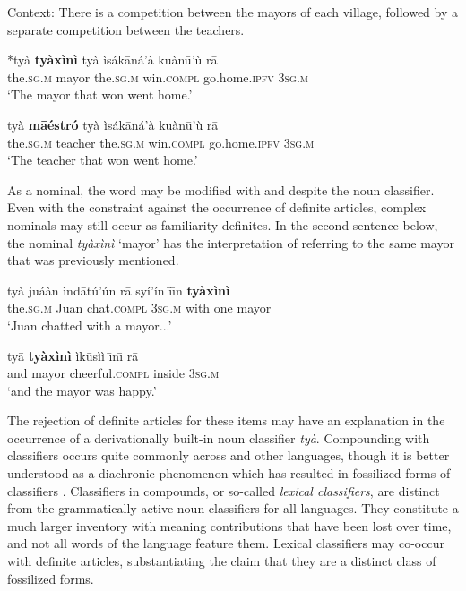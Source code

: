 \documentclass[output=paper,modfonts,nonflat]{langsci/langscibook}
\begin{document}
\ea {}\label{ex:cisneros:81}
Context: There is a competition between the mayors of each village, followed by a separate competition between the teachers.

\ea
\gll
{\ob}{\op}\textnormal{*}ty\`a{\cp} \textbf{ty\`ax\`in\`i} ty\`a \`is\'ak\=an\'a'\`a{\cb} ku\`an\=u'\`u r\=a\\
\phantom{[(*}the.\textsc{sg.m} mayor the.\textsc{sg.m} win.\textsc{compl} go.home.\textsc{ipfv} 3\textsc{sg.m}\\
\glt
`The mayor that won went home.'

\ex
\gll
{\ob}{\op}ty\`a{\cp} \textbf{m\=a\'estr\'o} ty\`a \`is\'ak\=an\'a'\`a{\cb} ku\`an\=u'\`u r\=a\\
\phantom{[(}the.\textsc{sg.m} teacher the.\textsc{sg.m} win.\textsc{compl} go.home.\textsc{ipfv} 3\textsc{sg.m}\\
\glt
`The teacher that won went home.'
\z  
\z
 
As a nominal, the word may be modified with  and  despite the noun classifier. Even with the constraint against the occurrence of definite articles, complex nominals may still occur as familiarity definites.  In the second sentence below, the nominal \textit{ty\`ax\`in\`i} `mayor' has the interpretation of referring to the same mayor that was previously mentioned.

\ea {}\label{ex:cisneros:82}
\gll
{\ob}ty\`a ju\'a\`an{\cb} \`ind\=at\'u'\'un r\=a sy\'i'\'in {\ob}\=\i\=\i n \textbf{ty\`ax\`in\`i}{\cb}\\
{\db}the.\textsc{sg.m} Juan chat.\textsc{compl} 3\textsc{sg.m} with {\db}one mayor\\
\glt
`Juan chatted with a mayor...'

\ea
\gll
ty\=a \textbf{ty\`ax\`in\`i} \`ik\=us\`i\`i \=\i n\=\i{} r\=a\\
and mayor cheerful.\textsc{compl} inside 3\textsc{sg.m}\\
\glt
`and the mayor was happy.'
\z 
\z 

The rejection of definite articles for these items may have an explanation in the occurrence of a derivationally built-in noun classifier \textit{ty\`a}. Compounding with classifiers occurs quite commonly across  and other  languages, though it is better understood as a diachronic phenomenon which has resulted in fossilized forms of classifiers \citep{Macri1983}.  Classifiers in compounds, or so-called \textit{lexical classifiers}, are distinct from the grammatically active noun classifiers for all  languages.  They constitute a much larger inventory with meaning contributions that have been lost over time, and not all words of the language feature them.  Lexical classifiers may co-occur with definite articles, substantiating the claim that they are a distinct class of fossilized forms.
\end{document}
